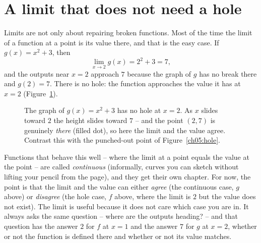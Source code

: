 \section{A limit that does not need a hole}

Limits are not only about repairing broken functions. Most of the
time the limit of a function at a point is its value there, and that is the easy case. If
$g(x) = x^2 + 3$, then
\[
  \lim_{x \to 2} g(x) = 2^2 + 3 = 7,
\]
and the outputs near $x = 2$ approach $7$ because the graph of $g$ has no break there and
$g(2) = 7$. There is no hole: the function approaches the value it has at $x=2$
(Figure~\ref{ch05:nohole}).

\begin{figure}[htbp]
\centering
{}
\caption{The graph of $g(x)=x^2+3$ has no hole at $x=2$. As $x$ slides toward $2$ the height
slides toward $7$ -- and the point $(2,7)$ is genuinely \emph{there} (filled dot), so here the
limit and the value agree. Contrast this with the punched-out point of Figure~\ref{ch05:hole}.}
\label{ch05:nohole}
\end{figure}

Functions that behave this well -- where the limit at a point equals the value at the point --
are called \emph{continuous} (informally, curves you can sketch without lifting your pencil from
the page), and they get their own chapter. For now, the point is that the
limit and the value can either \emph{agree} (the continuous case, $g$ above) or \emph{disagree}
(the hole case, $f$ above, where the limit is $2$ but the value does not exist). The limit
is useful because it does not care which case you are in. It always asks the
same question -- where are the outputs heading? -- and that question has the answer $2$ for
$f$ at $x=1$ and the answer $7$ for $g$ at $x=2$, whether or not the function is defined
there and whether or not its value matches.

